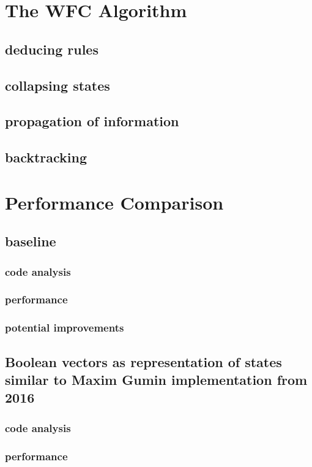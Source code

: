 \documentclass[shortabstract, english, inz]{iithesis}
\begin{document}
\chapter{The WFC Algorithm}
\label{chapter3}
\section{deducing rules}
\section{collapsing states}
\section{propagation of information}
\section{backtracking}
\label{backtracking}
\cite{Smith}



\chapter{Performance Comparison}
\label{chapter4}
    \section{baseline}
        \subsection{code analysis}
        \subsection{performance}
        \subsection{potential improvements}
    \section{Boolean vectors as representation of states \fmlinebreak similar to Maxim Gumin implementation from 2016}
        \subsection{code analysis}
        \subsection{performance}
\end{document}
